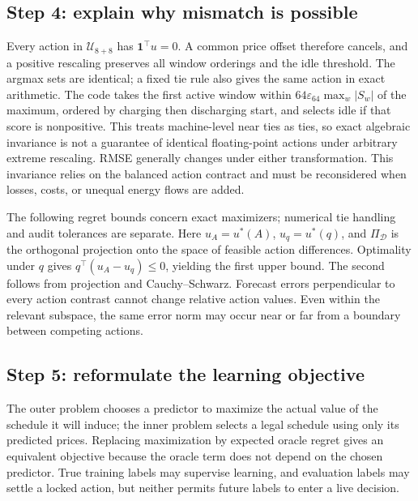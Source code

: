 \documentclass[11pt,a4paper]{article}
\begin{document}
\subsection{Step 4: explain why mismatch is possible}
\EqInvariance
Every action in $\mathcal U_{8+8}$ has $\mathbf1^\top u=0$. A common price offset therefore cancels, and a positive rescaling preserves all window orderings and the idle threshold. The argmax sets are identical; a fixed tie rule also gives the same action in exact arithmetic. The code takes the first active window within $64\varepsilon_{64}\max_w|S_w|$ of the maximum, ordered by charging then discharging start, and selects idle if that score is nonpositive. This treats machine-level near ties as ties, so exact algebraic invariance is not a guarantee of identical floating-point actions under arbitrary extreme rescaling. RMSE generally changes under either transformation. This invariance relies on the balanced action contract and must be reconsidered when losses, costs, or unequal energy flows are added.

\EqRegret
The following regret bounds concern exact maximizers; numerical tie handling and audit tolerances are separate. Here $u_A=u^*(A)$, $u_q=u^*(q)$, and $\Pi_{\mathcal D}$ is the orthogonal projection onto the space of feasible action differences. Optimality under $q$ gives $q^\top(u_A-u_q)\le0$, yielding the first upper bound. The second follows from projection and Cauchy--Schwarz. Forecast errors perpendicular to every action contrast cannot change relative action values. Even within the relevant subspace, the same error norm may occur near or far from a boundary between competing actions.

\subsection{Step 5: reformulate the learning objective}
\EqOuter
The outer problem chooses a predictor to maximize the actual value of the schedule it will induce; the inner problem selects a legal schedule using only its predicted prices. Replacing maximization by expected oracle regret gives an equivalent objective because the oracle term does not depend on the chosen predictor. True training labels may supervise learning, and evaluation labels may settle a locked action, but neither permits future labels to enter a live decision.
\end{document}
